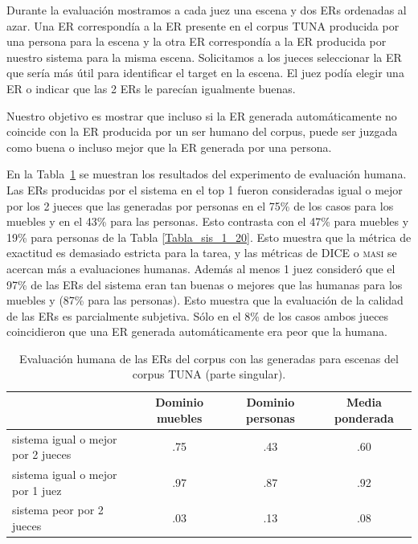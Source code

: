 Durante la evaluaci\'on mostramos a cada juez una escena y dos ERs ordenadas al azar. Una ER correspond\'ia a la ER presente en el corpus TUNA producida por una persona para la escena y la otra ER correspond\'ia a la ER producida por nuestro sistema para la misma escena. Solicitamos a los jueces seleccionar la ER que ser\'{i}a m\'as \'util para identificar el target en la escena. El juez pod\'ia elegir una ER o indicar que las 2 ERs le parec\'ian igualmente buenas.

Nuestro objetivo es mostrar que incluso si la ER generada autom\'aticamente no coincide con la ER producida por un ser humano del corpus, puede ser juzgada como buena o incluso mejor que la ER generada por una persona.

En la Tabla~\ref{system-versus-human} se muestran los resultados del experimento de evaluaci\'on humana.
Las ERs producidas por el sistema en el top 1 fueron consideradas igual o mejor por los 2 jueces que las generadas por personas en el 75\% de los casos para los muebles y en el 43\% para las personas. Esto contrasta con el 47\% para muebles y 19\% para personas de la Tabla \ref{Tabla_sis_1_20}. Esto muestra que la m\'etrica de exactitud es demasiado estricta para la tarea, y las m\'etricas de DICE o \textsc {masi} se acercan m\'as a evaluaciones humanas. Adem\'as al menos 1 juez consider\'o que el 97\% de las ERs del sistema eran tan buenas o mejores que las humanas para los muebles y (87\% para las personas). Esto muestra que la evaluaci\'on de la calidad de las ERs es parcialmente subjetiva. S\'olo en el 8\% de los casos ambos jueces coincidieron que una ER generada autom\'aticamente era peor que la humana.

\begin{table}[H]
\begin{center}
\begin{tabular}{|l|c|c|c|}
\hline

 & Dominio muebles & Dominio personas & Media ponderada \\
\hline
sistema igual o mejor por 2 jueces  &.75  &       .43	&       .60 \\
sistema igual o mejor por 1 juez  &.97	&	.87	&	.92 \\
sistema peor por 2 jueces &	.03	&	.13	&	.08 \\
\hline
\end{tabular}
\caption{Evaluaci\'on humana de las ERs del corpus con las generadas para escenas del corpus TUNA (parte singular).} 
\label{system-versus-human}
\vspace*{-.5cm}
\end{center}
\end{table}

